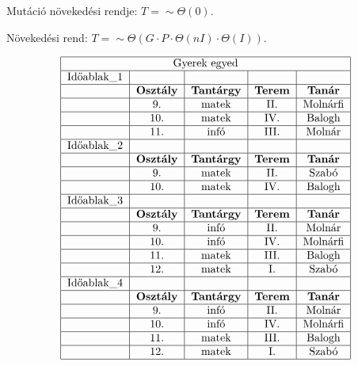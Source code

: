 \documentclass[a4paper,12pt]{article}
\begin{document}
Mutáció növekedési rendje: $T=\sim \Theta(0)$.

Növekedési rend: $T=\sim \Theta(G \cdot P \cdot \Theta(nI) \cdot \Theta(I))$.

$$
\begin{tabular}{|l|c|c|c|c|}
\hline
\multicolumn{5}{|c|}{Gyerek egyed}\\
\hline
Időablak\_1 & & & &\\
\hline
& \bf{Osztály} & \bf{Tantárgy} & \bf{Terem} & \bf{Tanár}\\
\hline
& 9. & matek & II. & Molnárfi\\
\hline 
& 10. & matek & IV. & Balogh\\
\hline
& 11. & infó & III. & Molnár\\
\hline
Időablak\_2 & & & &\\
\hline
& \bf{Osztály} & \bf{Tantárgy} & \bf{Terem} & \bf{Tanár}\\
\hline
& 9. & matek & II. & Szabó\\
\hline
& 10. & matek & IV. & Balogh\\
\hline
Időablak\_3 & & & &\\
\hline
& \bf{Osztály} & \bf{Tantárgy} & \bf{Terem} & \bf{Tanár}\\
\hline
& 9. & infó & II. & Molnár\\
\hline
& 10. & infó & IV. & Molnárfi\\
\hline
& 11. & matek & III. & Balogh\\
\hline
& 12. & matek & I. & Szabó\\
\hline
Időablak\_4 & & & &\\
\hline
& \bf{Osztály} & \bf{Tantárgy} & \bf{Terem} & \bf{Tanár}\\
\hline
& 9. & infó & II. & Molnár\\
\hline
& 10. & infó & IV. & Molnárfi\\
\hline
& 11. & matek & III. & Balogh\\
\hline
& 12. & matek & I. & Szabó\\
\hline
\end{tabular}
$$
\end{document}
